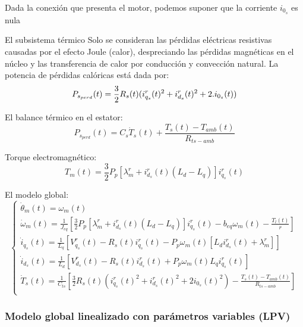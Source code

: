 \documentclass{article}
\begin{document}
Dada la conexión que presenta el motor, podemos suponer que la corriente $i_{0_{s}}$ es nula

El subsistema térmico
Solo se consideran las pérdidas eléctricas resistivas causadas por el efecto Joule (calor),
 despreciando las pérdidas magnéticas en el núcleo y las transferencia de calor por conducción 
y convección natural. La potencia de pérdidas calóricas está dada por:\\
\begin{equation}
    P_{s_{perd}}(t) =  \frac{3}{2}R_{s}(t)(i_{q_{s}}^r(t)^2+i_{d_{s}}^r(t)^2+2.i_{0_{s}}(t))\\
\end{equation}
\par El balance térmico en el estator:
\begin{equation}
    P_{s_{perd}}(t) = C_{s}\dot{T}_{s}(t) + \frac{T_{s}(t)-T_{amb}(t)}{R_{ts-amb}}
\end{equation}

Torque electromagnético:
\begin{equation}
    T_{m}(t) = \frac{3}{2}P_{p}[\lambda_{m}^r+i_{d_{s}}^r(t)(L_{d}-L_{q})]i_{q_{s}}^r(t)
\end{equation}

El modelo global:
\begin{equation}
    \begin{cases}
        \dot{\theta}_{m}(t) = \omega_{m}(t)\\
        \dot{\omega}_{m}(t) = \frac{1}{J_{eq}}[\frac{3}{2}P_{p}[\lambda_{m}^r+i_{d_{s}}^r(t)(L_{d}-L_{q})]i_{q_{s}}^r(t) - b_{eq}\omega_{m}(t) - \frac{T_{l}(t)}{r}]\\
        \dot{i}_{q_{s}}(t) = \frac{1}{L_{q}}[V_{q_{s}}^r(t) - R_{s}(t)i_{q_{s}}^r(t) - P_{p}\omega_{m}(t)[L_{d}i_{d_{s}}^r(t)+\lambda_{m}^r]]  \\
        \dot{i}_{d_{s}}(t) = \frac{1}{L_{d}}[V_{d_{s}}^r(t) - R_{s}(t)i_{d_{s}}^r(t) + P_{p}\omega_{m}(t)L_{q}i_{q_{s}}^r(t)]  \\
        \dot{T}_{s}(t) = \frac{1}{C_{ts}}[\frac{3}{2}R_{s}(t)({i_{q_{s}}^r(t)}^2+{i_{d_{s}}^r(t)}^2+2i_{0_{s}}(t)^2)-\frac{T_{s}(t)-T_{amb}(t)}{R_{ts-amb}}]\\
    \end{cases}
\end{equation}



\subsubsection*{Modelo global linealizado con parámetros variables (LPV)}
\end{document}
